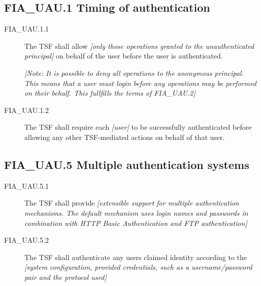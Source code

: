 \documentclass[10pt,a4paper,english]{book}
\begin{document}
\hypertarget{fia-uau-1-timing-of-authentication}{}
\subsection{FIA{\_}UAU.1 Timing of authentication}
\begin{description}
\item[FIA{\_}UAU.1.1 ]

The TSF shall allow \emph{{[}only those operations granted to the
unauthenticated principal]} on behalf of the user before the user is
authenticated.

\emph{{[}Note: It is possible to deny all operations to the anonymous
principal. This means that a user must login before any operations may
be performed on their behalf. This fullfills the terms of FIA{\_}UAU.2]}

\item[FIA{\_}UAU.1.2 ]

The TSF shall require each \emph{{[}user]} to be successfully
authenticated before allowing any other TSF-mediated actions on behalf
of that user.

\end{description}



\hypertarget{fia-uau-5-multiple-authentication-systems}{}
\subsection{FIA{\_}UAU.5 Multiple authentication systems}
\begin{description}
\item[FIA{\_}UAU.5.1 ]

The TSF shall provide \emph{{[}extensible support for multiple
authentication mechanisms. The default mechanism uses login names
and passwords in combination with HTTP Basic Authentication and FTP
authentication]}

\item[FIA{\_}UAU.5.2]

The TSF shall authenticate any users claimed identity according to
the \emph{{[}system configuration, provided credentials, such as a
username/password pair and the protocol used]}

\end{description}
\end{document}
